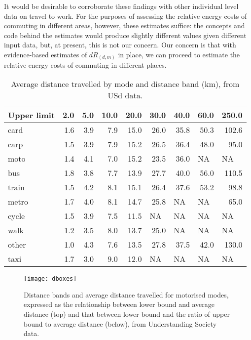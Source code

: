 It would be desirable to corroborate these findings with other individual level
data on travel to work. For the purposes of assessing the relative energy
costs of commuting in different areas, however, these estimates suffice:
the concepts and code behind the estimates would produce slightly different
values given different input data, but, at present, this is not our concern.
Our concern is that with evidence-based estimates of $dR_{(d,m)}$ in place,
we can proceed to estimate the relative energy costs of commuting in different
places. 

\begin{table}[htbp]
\caption[Average distance travelled by mode and distance band]
{Average distance travelled by mode and distance band (km),
from USd data.}\label{tdboxes}
\begin{center}
\begin{tabular}{lrrrrrrrr}
\toprule
Upper limit & 2.0 & 5.0 & 10.0 & 20.0 & 30.0 & 40.0 & 60.0 & 250.0 \\ \midrule
card & 1.6 & 3.9 & 7.9 & 15.0 & 26.0 & 35.8 & 50.3 & 102.6 \\
carp & 1.5 & 3.9 & 7.9 & 15.2 & 26.5 & 36.4 & 48.0 & 95.0 \\
moto & 1.4 & 4.1 & 7.0 & 15.2 & 23.5 & 36.0 & \multicolumn{1}{l}{NA} & \multicolumn{1}{l}{NA} \\
bus & 1.8 & 3.8 & 7.7 & 13.9 & 27.7 & 40.0 & 56.0 & 110.5 \\
train & 1.5 & 4.2 & 8.1 & 15.1 & 26.4 & 37.6 & 53.2 & 98.8 \\
metro & 1.7 & 4.0 & 8.1 & 14.7 & 25.8 & \multicolumn{1}{l}{NA} & \multicolumn{1}{l}{NA} & 65.0 \\
cycle & 1.5 & 3.9 & 7.5 & 11.5 & \multicolumn{1}{l}{NA} & \multicolumn{1}{l}{NA} & \multicolumn{1}{l}{NA} & \multicolumn{1}{l}{NA} \\
walk & 1.2 & 3.5 & 8.0 & 13.7 & 25.0 & \multicolumn{1}{l}{NA} & \multicolumn{1}{l}{NA} & \multicolumn{1}{l}{NA} \\
other & 1.0 & 4.3 & 7.6 & 13.5 & 27.8 & 37.5 & 42.0 & 130.0 \\
taxi & 1.7 & 3.0 & 9.0 & 12.0 & \multicolumn{1}{l}{NA} & \multicolumn{1}{l}{NA} & \multicolumn{1}{l}{NA} & \multicolumn{1}{l}{NA} \\
\bottomrule
\end{tabular}
\end{center}
\end{table}

\begin{figure}[htbp]
\begin{center}
    \texttt{[image: dboxes]}\end{center}
  \caption[Distance bands and average distance travelled for motorised modes]
  {Distance bands and average distance travelled for motorised modes, expressed
  as the relationship between lower bound and average distance (top)
  and that between lower bound and the ratio of upper bound to average distance
  (below), from Understanding Society data.} %
  \label{fdboxes}
\end{figure}

